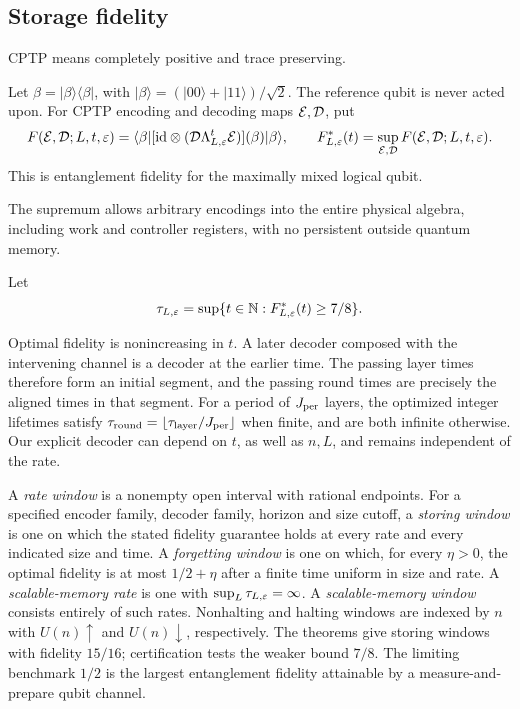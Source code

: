 \subsection{Storage fidelity}
CPTP means completely positive and trace preserving.
\begin{definition}\label{def:fidelity}
Let \(\beta=|\beta\rangle\langle\beta|\), with
\(|\beta\rangle=(|00\rangle+|11\rangle)/\sqrt2\). The reference qubit
is never acted upon. For CPTP encoding and decoding maps \(\mathcal E,\mathcal D\), put
\begin{equation}\label{eq:fidelity}
 F(\mathcal E,\mathcal D;L,t,\varepsilon)=
 \langle\beta|[\mathrm{id}\otimes
 (\mathcal D\Lambda_{L,\varepsilon}^t\mathcal E)](\beta)|\beta\rangle,
 \qquad F^*_{L,\varepsilon}(t)=\sup_{\mathcal E,\mathcal D}F(\mathcal E,\mathcal D;L,t,\varepsilon).
\end{equation}
This is entanglement fidelity for the maximally mixed logical qubit.
\end{definition}
The supremum allows arbitrary encodings into the entire physical
algebra, including work and controller registers, with no persistent
outside quantum memory. \begin{definition}\label{def:lifetime}
Let
\[
 \tau_{L,\varepsilon}=\sup\{t\in\mathbb N:F^*_{L,\varepsilon}(t)\ge7/8\}.
\]
\end{definition}
Optimal fidelity is nonincreasing in \(t\). A later decoder composed with the intervening channel is a decoder at the earlier time. The passing layer times
therefore form an initial segment, and the passing round times are
precisely the aligned times in that segment. For a period of \(J_{\rm per}\)
layers, the optimized integer lifetimes satisfy
\(\tau_{\rm round}=\lfloor\tau_{\rm layer}/J_{\rm per}\rfloor\) when finite,
and are both infinite otherwise. Our explicit decoder can depend
on \(t\), as well as \(n,L\), and remains independent of the rate.


\begin{definition}\label{def:windows}
A \emph{rate window} is a nonempty open interval with rational endpoints. For a specified encoder family, decoder family, horizon and size cutoff, a \emph{storing window} is one on which the stated fidelity guarantee holds at every rate and every indicated size and time. A \emph{forgetting window} is one on which, for every \(\eta>0\), the optimal fidelity is at most \(1/2+\eta\) after a finite time uniform in size and rate. A \emph{scalable-memory rate} is one with \(\sup_L\tau_{L,\varepsilon}=\infty\). A \emph{scalable-memory window} consists entirely of such rates. Nonhalting and halting windows are indexed by \(n\) with \(U(n)\uparrow\) and \(U(n)\downarrow\), respectively. The theorems give storing windows with fidelity \(15/16\); certification tests the weaker bound \(7/8\). The limiting benchmark \(1/2\) is the largest entanglement fidelity attainable by a measure-and-prepare qubit channel.
\end{definition}

